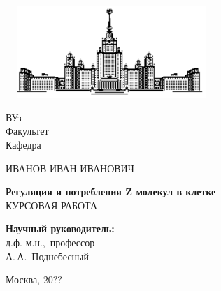 \begin{titlepage}
\begin{center}
\includegraphics[width=8cm, height=3.5cm]{pic/msu.eps}
\end{center}
\begin{center}
ВУз\\
\vspace{0.1 cm}
Факультет\\
\vspace{0.1 cm}
Кафедра 

\vspace{3cm}
{\Large ИВАНОВ ИВАН ИВАНОВИЧ}\\
\vspace{1cm}

{\bf\LARGE Регуляция и потребления Z молекул в клетке}\\ \vspace{2cm}
КУРСОВАЯ РАБОТА

\end{center}
\vspace{2cm}
\begin{flushright}

{\bf Научный руководитель:}\\
д.ф.-м.н.,~профессор\\ 
А.\,А.~Поднебесный

\end{flushright}

\hfill

\centerline {Москва, 20??}

\end{titlepage}
